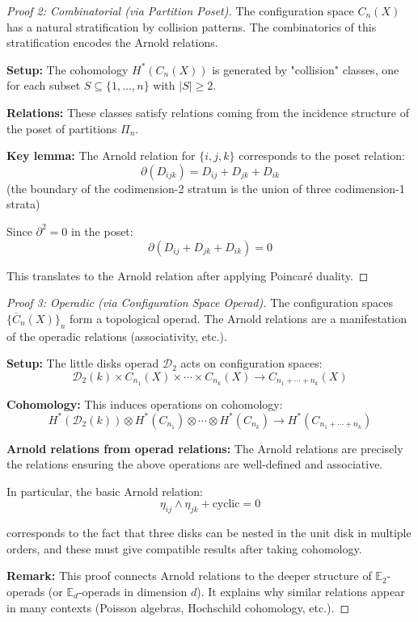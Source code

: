 \begin{proof}[Proof 2: Combinatorial (via Partition Poset)]
The configuration space $C_n(X)$ has a natural stratification by collision patterns. The combinatorics of this stratification encodes the Arnold relations.

\textbf{Setup:} The cohomology $H^*(C_n(X))$ is generated by "collision" classes, one for each subset $S \subseteq \{1,\ldots,n\}$ with $|S| \geq 2$.

\textbf{Relations:} These classes satisfy relations coming from the incidence structure of the poset of partitions $\Pi_n$.

\textbf{Key lemma:} The Arnold relation for $\{i,j,k\}$ corresponds to the poset relation:
$$\partial(D_{ijk}) = D_{ij} + D_{jk} + D_{ik}$$
(the boundary of the codimension-2 stratum is the union of three codimension-1 strata)

Since $\partial^2 = 0$ in the poset:
$$\partial(D_{ij} + D_{jk} + D_{ik}) = 0$$

This translates to the Arnold relation after applying Poincaré duality.
\end{proof}

\begin{proof}[Proof 3: Operadic (via Configuration Space Operad)]
The configuration spaces $\{\overline{C}_n(X)\}_n$ form a topological operad. The Arnold relations are a manifestation of the operadic relations (associativity, etc.).

\textbf{Setup:} The little disks operad $\mathcal{D}_2$ acts on configuration spaces:
$$\mathcal{D}_2(k) \times C_{n_1}(X) \times \cdots \times C_{n_k}(X) \to C_{n_1+\cdots+n_k}(X)$$

\textbf{Cohomology:} This induces operations on cohomology:
$$H^*(\mathcal{D}_2(k)) \otimes H^*(C_{n_1}) \otimes \cdots \otimes H^*(C_{n_k}) \to H^*(C_{n_1+\cdots+n_k})$$

\textbf{Arnold relations from operad relations:} The Arnold relations are precisely the relations ensuring the above operations are well-defined and associative.

In particular, the basic Arnold relation:
$$\eta_{ij} \wedge \eta_{jk} + \text{cyclic} = 0$$

corresponds to the fact that three disks can be nested in the unit disk in multiple orders, and these must give compatible results after taking cohomology.

\textbf{Remark:} This proof connects Arnold relations to the deeper structure of $\mathbb{E}_2$-operads (or $\mathbb{E}_d$-operads in dimension $d$). It explains why similar relations appear in many contexts (Poisson algebras, Hochschild cohomology, etc.).
\end{proof}

